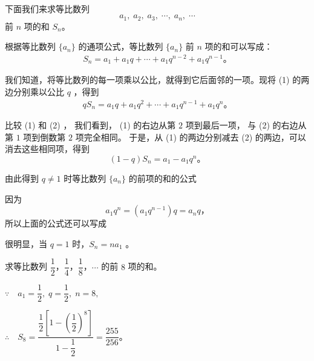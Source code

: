 \,

下面我们来求等比数列
$$ a_1,\; a_2,\; a_3,\; \cdots,\; a_n,\;  \cdots $$
前 $n$ 项的和 $S_n$。

根据等比数列 $\{a_n\}$ 的通项公式，等比数列 $\{a_n\}$ 前 $n$ 项的和可以写成：
\begin{gather*}
    S_n = a_1 + a_1 q + \cdots + a_1 q^{n-2} + a_1 q^{n-1} \text{。} \tag{$1$}
\end{gather*}

我们知道，将等比数列的每一项乘以公比，就得到它后面邻的一项。现将 (1) 的两边分别乘以公比 $q$ ，得到
\begin{gather*}
    q S_n = a_1 q + a_1 q^2 + \cdots + a_1 q^{n-1} + a_1 q^n \text{。} \tag{$2$}
\end{gather*}

比较 (1) 和 (2) ， 我们看到， (1) 的右边从第 $2$ 项到最后一项， 与 (2) 的右边从第 $1$ 项到倒数第 $2$ 项完全相同。
于是，从 (1) 的两边分别减去 (2) 的两边，可以消去这些相同项，得到
$$ (1 - q)S_n = a_1 - a_1 q^n \text{。} $$

由此得到 $q \neq 1$ 时等比数列 $\{a_n\}$ 的前项的和的公式
\begin{center}
\end{center}

因为
$$ a_1 q^n = (a_1 q^{n - 1})q = a_n q \text{，}$$
所以上面的公式还可以写成
\begin{center}
\end{center}

很明显，当 $q = 1$ 时，$S_n = n a_1$ 。

\liti 求等比数列 $\dfrac{1}{2}$，$\dfrac{1}{4}$，$\dfrac{1}{8}$，$\cdots$ 的前 $8$ 项的和。

\jie $\because \quad a_1 = \dfrac{1}{2},\; q = \dfrac{1}{2},\; n = 8,$

$\therefore \quad  S_8 = \dfrac{\dfrac{1}{2} \left[ 1 - \left( \dfrac{1}{2} \right)^8 \right]}{1 - \dfrac{1}{2}} = \dfrac{255}{256} \text{。} $


